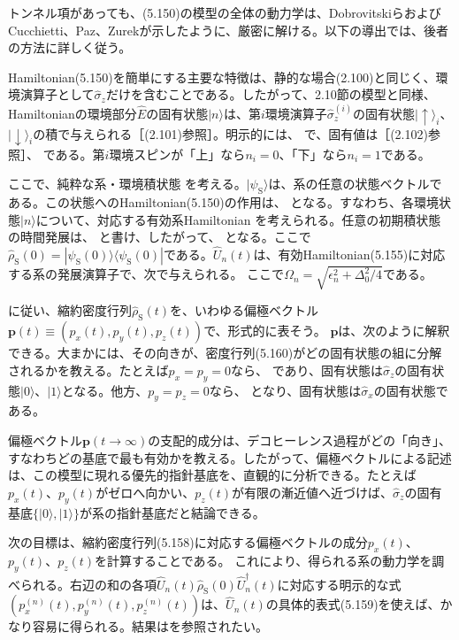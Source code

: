 トンネル項があっても、(5.150)の模型の全体の動力学は、Dobrovitskiら\cite{ref243}およびCucchietti、Paz、Zurek\cite{ref118}が示したように、厳密に解ける。以下の導出では、後者の方法\cite{ref118}に詳しく従う。

Hamiltonian(5.150)を簡単にする主要な特徴は、静的な場合(2.100)と同じく、環境演算子として$\hat\sigma_z$だけを含むことである。したがって、2.10節の模型と同様、Hamiltonianの環境部分$\hat E$の固有状態$|n\rangle$は、第$i$環境演算子$\hat\sigma_z^{(i)}$の固有状態$|\uparrow\rangle_i$、$|\downarrow\rangle_i$の積で与えられる［(2.101)参照］。明示的には、
で、固有値は［(2.102)参照］、
である。第$i$環境スピンが「上」なら$n_i=0$、「下」なら$n_i=1$である。

ここで、純粋な系・環境積状態
を考える。$|\psi_{\mathrm S}\rangle$は、系の任意の状態ベクトルである。この状態へのHamiltonian(5.150)の作用は、
となる。すなわち、各環境状態$|n\rangle$について、対応する有効系Hamiltonian
を考えられる。任意の初期積状態
\hypertarget{srcpage:225}{}\label{srcpage:225}
の時間発展は、
と書け、したがって、
となる。ここで$\hat\rho_{\mathrm S}(0)=|\psi_{\mathrm S}(0)\rangle\langle\psi_{\mathrm S}(0)|$である。$\hat U_n(t)$は、有効Hamiltonian(5.155)に対応する系の発展演算子で、次で与えられる\cite{ref118}。
ここで$\Omega_n=\sqrt{\epsilon_n^2+\Delta_0^2/4}$である。

\cite{ref118}に従い、縮約密度行列$\hat\rho_{\mathrm S}(t)$を、いわゆる偏極ベクトル$\boldsymbol p(t)\equiv(p_x(t),p_y(t),p_z(t))$で、形式的に表そう。
$\boldsymbol p$は、次のように解釈できる。大まかには、その向きが、密度行列(5.160)がどの固有状態の組に分解されるかを教える。たとえば$p_x=p_y=0$なら、
であり、固有状態は$\hat\sigma_z$の固有状態$|0\rangle$、$|1\rangle$となる。他方、$p_y=p_z=0$なら、
となり、固有状態は$\hat\sigma_x$の固有状態である。

偏極ベクトル$\boldsymbol p(t\to\infty)$の支配的成分は、デコヒーレンス過程がどの「向き」、すなわちどの基底で最も有効かを教える。したがって、偏極ベクトルによる記述は、この模型に現れる優先的指針基底を、直観的に分析できる。たとえば$p_x(t)$、$p_y(t)$がゼロへ向かい、$p_z(t)$が有限の漸近値へ近づけば、$\hat\sigma_z$の固有基底$\{|0\rangle,|1\rangle\}$が系の指針基底だと結論できる。

次の目標は、縮約密度行列(5.158)に対応する偏極ベクトルの成分$p_x(t)$、$p_y(t)$、$p_z(t)$を計算することである。
\hypertarget{srcpage:226}{}\label{srcpage:226}
これにより、得られる系の動力学を調べられる。右辺の和の各項$\hat U_n(t)\hat\rho_{\mathrm S}(0)\hat U_n^\dagger(t)$に対応する明示的な式$(p_x^{(n)}(t),p_y^{(n)}(t),p_z^{(n)}(t))$は、$\hat U_n(t)$の具体的表式(5.159)を使えば、かなり容易に得られる。結果は\cite{ref118}を参照されたい。

